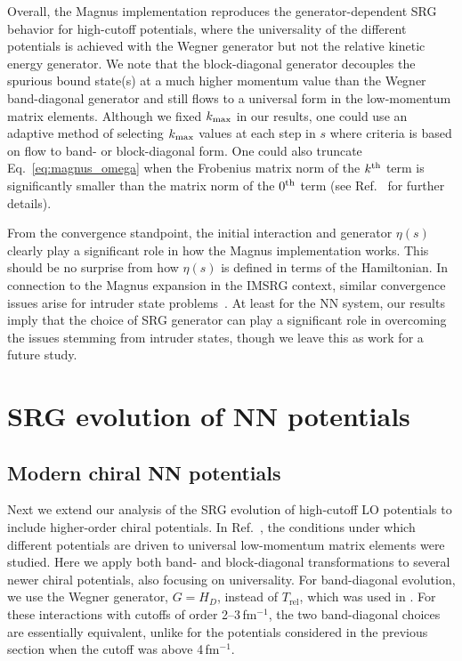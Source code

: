\documentclass[10pt,aps,prc,floatfix,twocolumn,nofootinbib]{revtex4-1}
\newcommand{\Trel}{\ensuremath{T_{\textrm{rel}}}}
\begin{document}
Overall, the Magnus implementation reproduces the generator-dependent SRG behavior for high-cutoff potentials, where the universality of the different potentials is achieved with the Wegner generator but not the relative kinetic energy generator.
We note that the block-diagonal generator decouples the spurious bound state(s) at a much higher momentum value than the Wegner band-diagonal generator and still flows to a universal form in the low-momentum matrix elements.
Although we fixed $k_{\rm max}$ in our results, one could use an adaptive method of selecting $k_{\rm max}$ values at each step in $s$ where criteria is based on flow to band- or block-diagonal form.
One could also truncate Eq.~\eqref{eq:magnus_omega} when the Frobenius matrix norm of the $k^{\rm th}$ term is significantly smaller than the matrix norm of the $0^{\rm th}$ term (see Ref.~\cite{Morris:2015yna} for further details).


From the convergence standpoint, the initial interaction and generator $\eta(s)$ clearly play a significant role in how the Magnus implementation works.
This should be no surprise from how $\eta(s)$ is defined in terms of the Hamiltonian.
In connection to the Magnus expansion in the IMSRG context, similar convergence issues arise for intruder state problems~\cite{Stroberg:2019mxo}.
At least for the NN system, our results imply that the choice of SRG generator can play a significant role in overcoming the issues stemming from intruder states, though we leave this as work for a future study.


\section{SRG evolution of NN potentials}
\label{sec:srg_evolution_nn_potentials}


\subsection{Modern chiral NN potentials}
\label{subsec:modern_chiral}


Next we extend our analysis of the SRG evolution of high-cutoff LO potentials to include higher-order chiral potentials.
In Ref.~\cite{Dainton:2013axa}, the conditions under which different potentials are driven to universal low-momentum matrix elements were studied.
Here we apply both band- and block-diagonal transformations to several newer chiral potentials, also focusing on universality.
For band-diagonal evolution, we use the Wegner generator, $G=H_D$, instead of \Trel, which was used in \cite{Dainton:2013axa}.
For these interactions with cutoffs of order 2--3\,fm$^{-1}$,  the two band-diagonal choices are essentially equivalent, unlike for the potentials considered in the previous section when the cutoff was above 4\,fm$^{-1}$.
\end{document}
